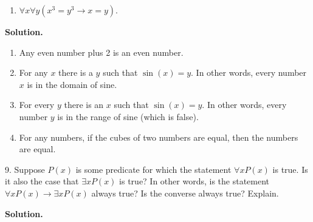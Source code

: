 \documentclass[10pt,]{book}
\theoremstyle{plain}
\theoremstyle{definition}
\theoremstyle{definition}
\theoremstyle{definition}
\numberwithin{equation}{section}
\def\imp{\rightarrow}
\begin{document}
\begin{exerciselist}
\begin{enumerate}[label=(\alph*)]
\item\hypertarget{li-140}{}\(\forall x \forall y (x^3 = y^3 \imp x = y)\).%
\end{enumerate}
\par\smallskip
\par\smallskip
\noindent\textbf{Solution.}\hypertarget{solution-14}{}\quad
\leavevmode%
\begin{enumerate}[label=(\alph*)]
\item\hypertarget{li-141}{} Any even number plus 2 is an even number. %
\item\hypertarget{li-142}{} For any \(x\) there is a \(y\) such that \(\sin(x) = y\). In other words, every number \(x\) is in the domain of sine. %
\item\hypertarget{li-143}{} For every \(y\) there is an \(x\) such that \(\sin(x) = y\). In other words, every number \(y\) is in the range of sine (which is false). %
\item\hypertarget{li-144}{} For any numbers, if the cubes of two numbers are equal, then the numbers are equal. %
\end{enumerate}
\item[9.]\hypertarget{exercise-9}{}
          Suppose \(P(x)\) is some predicate for which the statement \(\forall x P(x)\) is true. Is it also the case that \(\exists x P(x)\) is true? In other words, is the statement \(\forall x P(x) \imp \exists x P(x)\) always true? Is the converse always true? Explain.
\par\smallskip
\par\smallskip
\noindent\textbf{Solution.}\hypertarget{solution-15}{}\quad


\end{exerciselist}
\end{document}
